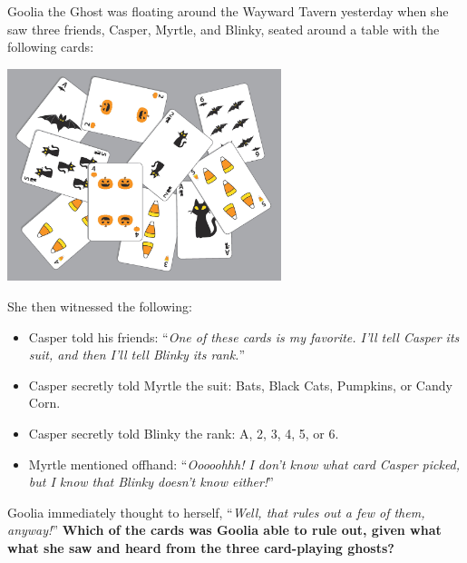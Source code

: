 

Goolia the Ghost was floating around the Wayward Tavern yesterday when she
saw three friends, Casper, Myrtle, and Blinky, seated around a table with the
following cards:

\begin{center}
    \includegraphics[width=0.6\textwidth]{assets/kat/cardstogeth}
\end{center}

She then witnessed the following:

\begin{itemize}
  \item Casper told his friends:
        ``\textit{One of these cards is my favorite. I'll tell Casper
        its suit, and then I'll tell Blinky its rank.}''
  \item Casper secretly told Myrtle the suit:
        Bats, Black Cats, Pumpkins, or Candy Corn.
  \item Casper secretly told Blinky the rank:
        A, 2, 3, 4, 5, or 6.
  \item Myrtle mentioned offhand:
        ``\textit{Ooooohhh! I don't know what card Casper picked, but I know
        that Blinky doesn't know either!}''
\end{itemize}

Goolia immediately thought to herself,
``\textit{Well, that rules out a few of them, anyway!}''
\textbf{Which of the cards was Goolia able to rule out, given what what
she saw and heard from the three card-playing ghosts?}

%

